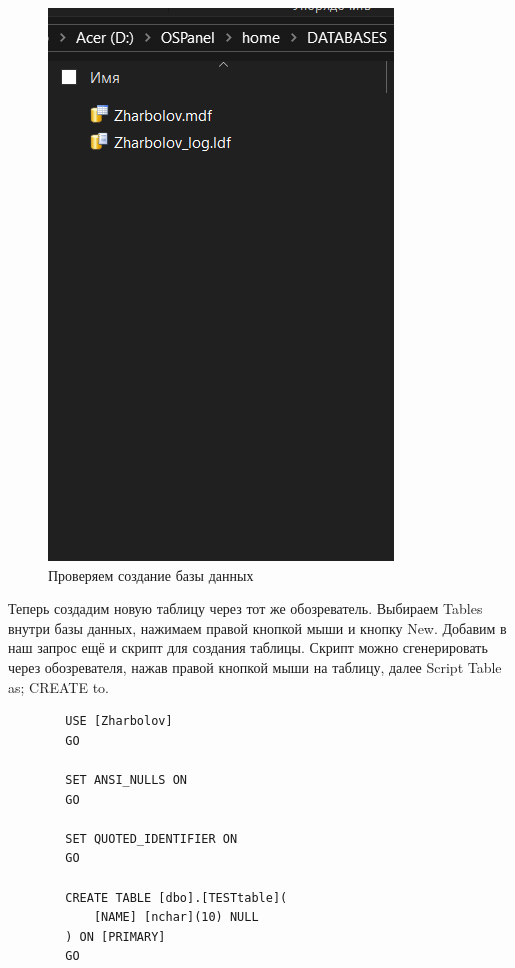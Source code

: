 \begin{figure}[h!]
\begin{minipage}[p]{0.45\linewidth}
        \includegraphics[width=0.82\linewidth]{Pic/lab1/DBCREATE.PNG}
        \caption{Проверяем создание базы данных}
        \label{fig:DBCREATE}
    \end{minipage}
    
\end{figure}

Теперь создадим новую таблицу через тот же обозреватель. Выбираем Tables внутри базы данных, нажимаем правой кнопкой мыши и кнопку New. Добавим в наш запрос ещё и скрипт для создания таблицы. Скрипт можно сгенерировать через обозревателя, нажав правой кнопкой мыши на таблицу, далее Script Table as; CREATE to.

\begin{verbatim}
        USE [Zharbolov]
        GO
        
        SET ANSI_NULLS ON
        GO
        
        SET QUOTED_IDENTIFIER ON
        GO
        
        CREATE TABLE [dbo].[TESTtable](
        	[NAME] [nchar](10) NULL
        ) ON [PRIMARY]
        GO
\end{verbatim}

